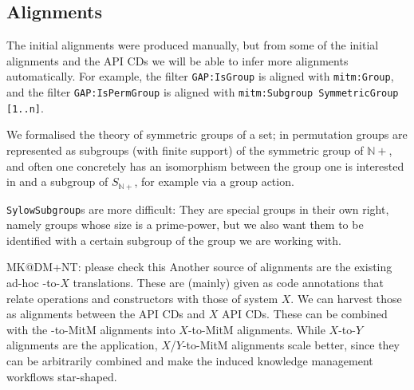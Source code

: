 \subsection{Alignments}

The initial alignments were produced manually, but from some of the initial alignments
and the \GAP API CDs we will be able to infer more alignments automatically.  For example,
the filter \texttt{GAP:IsGroup} is aligned with
\texttt{mitm:Group}, and the filter \texttt{GAP:IsPermGroup} is aligned with
\texttt{mitm:Subgroup SymmetricGroup [1..n]}.  

We formalised the theory of symmetric groups of a set; in \GAP permutation groups
are represented as subgroups (with finite support) of the symmetric group of
$\mathbb{N}+$, and often one concretely has an isomorphism between the group one
is interested in and a subgroup of $S_{\mathbb{N}+}$, for example
via a group action.

\texttt{SylowSubgroup}s are more difficult: They are special groups in their
own right, namely groups whose size is a prime-power, but we also want them
to be identified with a certain subgroup of the group we are working
with.

\begin{newpart}{MK@DM+NT: please check this }
  Another source of alignments are the existing ad-hoc \Sage-to-$X$ translations. These
  are (mainly) given as \Sage code annotations that relate \Sage operations and
  constructors with those of system $X$. We can harvest those as alignments between
  the \Sage API CDs and $X$ API CDs. These can be combined with the \Sage-to-MitM
  alignments into $X$-to-MitM alignments. While $X$-to-$Y$ alignments are the application,
  $X$/$Y$-to-MitM alignments scale better, since they can be arbitrarily combined and make
  the induced knowledge management workflows star-shaped.
\end{newpart}

